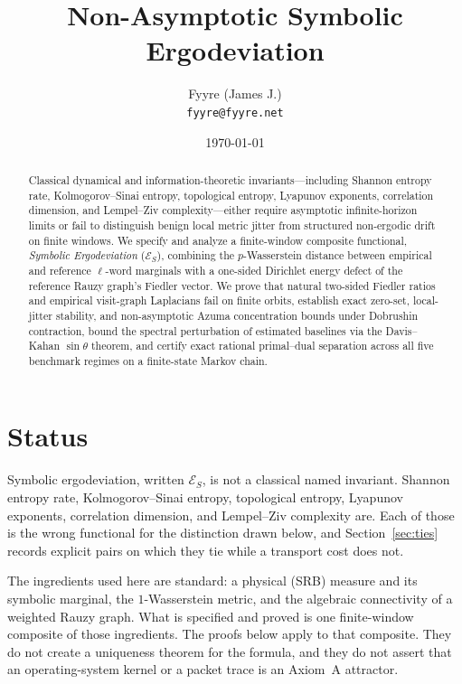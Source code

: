 \documentclass[11pt,reqno]{amsart}
\title{Non-Asymptotic Symbolic Ergodeviation}
\author{Fyyre (James J.) \\ \texttt{fyyre@fyyre.net}}
\date{\today}
\theoremstyle{remark}
\newcommand{\ES}{\mathcal{E}_S}
\begin{document}
\begin{abstract}
Classical dynamical and information-theoretic invariants---including Shannon entropy rate, Kolmogorov--Sinai entropy, topological entropy, Lyapunov exponents, correlation dimension, and Lempel--Ziv complexity---either require asymptotic infinite-horizon limits or fail to distinguish benign local metric jitter from structured non-ergodic drift on finite windows. We specify and analyze a finite-window composite functional, \emph{Symbolic Ergodeviation} ($\ES$), combining the $p$-Wasserstein distance between empirical and reference $\ell$-word marginals with a one-sided Dirichlet energy defect of the reference Rauzy graph's Fiedler vector. We prove that natural two-sided Fiedler ratios and empirical visit-graph Laplacians fail on finite orbits, establish exact zero-set, local-jitter stability, and non-asymptotic Azuma concentration bounds under Dobrushin contraction, bound the spectral perturbation of estimated baselines via the Davis--Kahan $\sin\theta$ theorem, and certify exact rational primal--dual separation across all five benchmark regimes on a finite-state Markov chain.
\end{abstract}

\maketitle

\section*{Status}

Symbolic ergodeviation, written $\ES$, is not a classical named invariant. Shannon entropy rate, Kolmogorov--Sinai entropy, topological entropy, Lyapunov exponents, correlation dimension, and Lempel--Ziv complexity are. Each of those is the wrong functional for the distinction drawn below, and Section~\ref{sec:ties} records explicit pairs on which they tie while a transport cost does not.

The ingredients used here are standard: a physical (SRB) measure and its symbolic marginal, the $1$-Wasserstein metric, and the algebraic connectivity of a weighted Rauzy graph. What is specified and proved is one finite-window composite of those ingredients. The proofs below apply to that composite. They do not create a uniqueness theorem for the formula, and they do not assert that an operating-system kernel or a packet trace is an Axiom~A attractor.
\end{document}
